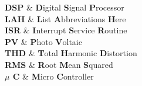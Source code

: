 \documentclass[11pt, oneside]{Thesis} %
\begin{document}

\pagestyle{fancy} %

\tableofcontents %

\listoffigures %

\listoftables %


\clearpage %


{
\textbf{DSP}  & \textbf{D}igital \textbf{S}ignal \textbf{P}rocessor\\

\textbf{LAH} & \textbf{L}ist \textbf{A}bbreviations \textbf{H}ere \\

\textbf{ISR}  & \textbf{I}nterrupt \textbf{S}ervice \textbf{R}outine\\

\textbf{PV} & \textbf{P}hoto \textbf{V}oltaic \\

\textbf{THD} & \textbf{T}otal \textbf{H}armonic \textbf{D}istortion \\

\textbf{RMS} & \textbf{R}oot \textbf{M}ean \textbf{S}quared \\

\textbf{$\mu $ C}  & \textbf{M}icro \textbf{C}ontroller \\

}
\end{document}
